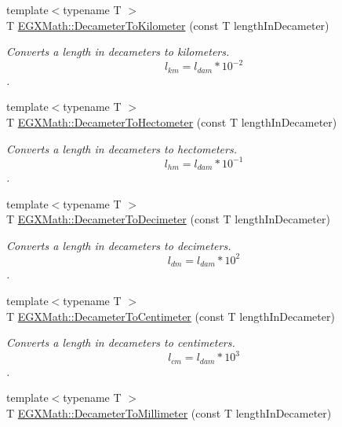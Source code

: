 \begin{DoxyCompactItemize}
{\footnotesize template$<$typename T $>$ }\\T \mbox{\hyperlink{group___e_g_x_math-_conversions-_length_conversions-_decameter-_s_i_gaecb6cb385676cad8430d23e529e4a59e}{E\+G\+X\+Math\+::\+Decameter\+To\+Kilometer}} (const T length\+In\+Decameter)
\begin{DoxyCompactList}\small\item\em Converts a length in decameters to kilometers. \[ l_{km}=l_{dam} * 10^{-2} \]. \end{DoxyCompactList}\item 
{\footnotesize template$<$typename T $>$ }\\T \mbox{\hyperlink{group___e_g_x_math-_conversions-_length_conversions-_decameter-_s_i_ga24daff76ac2de77bf8f55d134aa450d8}{E\+G\+X\+Math\+::\+Decameter\+To\+Hectometer}} (const T length\+In\+Decameter)
\begin{DoxyCompactList}\small\item\em Converts a length in decameters to hectometers. \[ l_{hm}=l_{dam} * 10^{-1} \]. \end{DoxyCompactList}\item 
{\footnotesize template$<$typename T $>$ }\\T \mbox{\hyperlink{group___e_g_x_math-_conversions-_length_conversions-_decameter-_s_i_gac3c82c1b67121be9717c2619bc26242b}{E\+G\+X\+Math\+::\+Decameter\+To\+Decimeter}} (const T length\+In\+Decameter)
\begin{DoxyCompactList}\small\item\em Converts a length in decameters to decimeters. \[ l_{dm}=l_{dam} * 10^{2} \]. \end{DoxyCompactList}\item 
{\footnotesize template$<$typename T $>$ }\\T \mbox{\hyperlink{group___e_g_x_math-_conversions-_length_conversions-_decameter-_s_i_gab715f0e130e7886966146153786abc5d}{E\+G\+X\+Math\+::\+Decameter\+To\+Centimeter}} (const T length\+In\+Decameter)
\begin{DoxyCompactList}\small\item\em Converts a length in decameters to centimeters. \[ l_{cm}=l_{dam} * 10^{3} \]. \end{DoxyCompactList}\item 
{\footnotesize template$<$typename T $>$ }\\T \mbox{\hyperlink{group___e_g_x_math-_conversions-_length_conversions-_decameter-_s_i_gaa1ebc69084f0d429e62a6af0ef509bb7}{E\+G\+X\+Math\+::\+Decameter\+To\+Millimeter}} (const T length\+In\+Decameter)

\end{DoxyCompactItemize}
